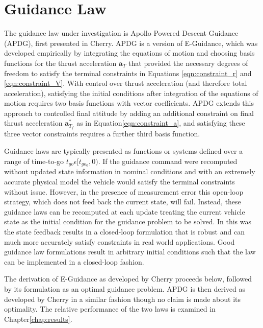 \section{Guidance Law} \label{sec:guidancelaw}
The guidance law under investigation is Apollo Powered Descent Guidance (APDG), first presented in Cherry\:\cite{CHERRY}. APDG is a version of E-Guidance, which was developed empirically by integrating the equations of motion and choosing basis functions for the thrust acceleration $\bm{a}_T$ that provided the necessary degrees of freedom to satisfy the terminal constraints in Equations \ref{eqn:constraint_r} and \ref{eqn:constraint_V}. With control over thrust acceleration (and therefore total acceleration), satisfying the initial conditions after integration of the equations of motion requires two basis functions with vector coefficients. APDG extends this approach to controlled final attitude by adding an additional constraint on final thrust acceleration $\bm{a}^*_{T_f}$ as in Equation\:\ref{eqn:constraint_a}, and satisfying these three vector constraints requires a further third basis function. 

Guidance laws are typically presented as functions or systems defined over a range of time-to-go $t_{go} \epsilon [t_{go_0}, 0)$. If the guidance command were recomputed without updated state information in nominal conditions and with an extremely accurate physical model the vehicle would satisfy the terminal constraints without issue. However, in the presence of measurement error this open-loop strategy, which does not feed back the current state, will fail. Instead, these guidance laws can be recomputed at each update treating the current vehicle state as the initial condition for the guidance problem to be solved. In this was the state feedback results in a closed-loop formulation that is robust and can much more accurately satisfy constraints in real world applications. Good guidance law formulations result in arbitrary initial conditions such that the law can be implemented in a closed-loop fashion.

The derivation of E-Guidance as developed by Cherry proceeds below, followed by its formulation as an optimal guidance problem. APDG is then derived as developed by Cherry in a similar fashion though no claim is made about its optimality. The relative performance of the two laws is examined in Chapter\:\ref{chap:results}.

